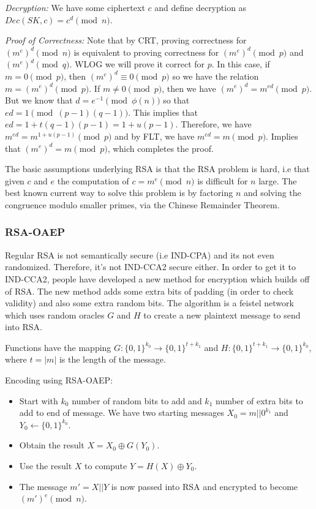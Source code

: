 \documentclass[psamsfonts]{amsart}
\begin{document}
\emph{Decryption:} We have some ciphertext $c$ and define decryption as $Dec(SK, c) = c^d \pmod{n}$.

\emph{Proof of Correctness:} Note that by CRT, proving correctness for $(m^e)^d \pmod{n}$ is equivalent to proving correctness for $(m^e)^d \pmod{p}$ and $(m^e)^d \pmod{q}$. WLOG we will prove it correct for $p$. In this case, if $m = 0 \pmod{p}$, then $(m^e)^d \equiv 0 \pmod{p}$ so we have the relation $m = (m^e)^d \pmod{p}$. If $m \neq 0 \pmod{p}$, then we have $(m^e)^d = m^{ed} \pmod{p}$. But we know that $d = e^{-1} \pmod{\phi(n)}$ so that $ed = 1 \pmod{(p-1)(q-1)}$. This implies that $ed = 1 + t(q-1)(p-1) = 1 + u(p-1)$. Therefore, we have $m^{ed} = m^{1+u(p-1)} \pmod{p}$ and by FLT, we have $m^{ed} = m \pmod{p}$. Implies that $(m^e)^d = m \pmod{p}$, which completes the proof.

The basic assumptions underlying RSA is that the RSA problem is hard, i.e that given $c$ and $e$ the computation of $c = m^e \pmod{n}$ is difficult for $n$ large. The best known current way to solve this problem is by factoring $n$ and solving the congruence modulo smaller primes, via the Chinese Remainder Theorem.

\subsubsection{RSA-OAEP}

Regular RSA is not semantically secure (i.e IND-CPA) and its not even randomized. Therefore, it's not IND-CCA2 secure either. In order to get it to IND-CCA2, people have developed a new method for encryption which builds off of RSA. The new method adds some extra bits of padding (in order to check validity) and also some extra random bits. The algorithm is a feistel network which uses random oracles $G$ and $H$ to create a new plaintext message to send into RSA.

Functions have the mapping $G: \{0,1\}^{k_0} \to \{0,1\}^{t + k_1}$ and $H: \{0,1\}^{t + k_1} \to \{0,1\}^{k_0}$, where $t = |m|$ is the length of the message.

Encoding using RSA-OAEP:
\begin{itemize}
  \item Start with $k_0$ number of random bits to add and $k_1$ number of extra bits to add to end of message. We have two starting messages $X_0 = m || 0^{k_1}$ and $Y_0 \leftarrow \{0,1\}^{k_0}$.
  \item Obtain the result $X = X_0 \oplus G(Y_0)$.
  \item Use the result $X$ to compute $Y = H(X) \oplus Y_0$.
  \item The message $m' = X || Y$ is now passed into RSA and encrypted to become $(m')^e \pmod{n}$.
\end{itemize}
\end{document}
